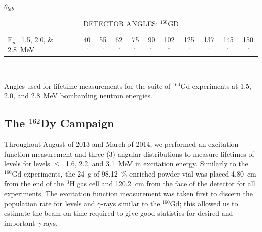 \begin{table}[h!]
\begin{center}
\caption{DETECTOR ANGLES: $^{160}$GD  \label{tab:GdAD}}
$\theta_{lab}$\\
\begin{tabular}{l|c|c|c|c|c|c|c|c|c|c}
\hline
\hline
E$_n$=1.5, 2.0, \& 2.8~MeV & 40$^{\circ}$ & 55$^{\circ}$ &  62$^{\circ}$ & 75$^{\circ}$ & 90$^{\circ}$ & 102$^{\circ}$ & 125$^{\circ}$ & 137$^{\circ}$ & 145$^{\circ}$ &  150$^{\circ}$\\
\end{tabular}\\
\vspace{10pt}
\end{center}
Angles used for lifetime measurements for the suite of $^{160}$Gd experiments at 1.5, 2.0, and 2.8~MeV bombarding neutron energies.
\end{table}


\subsection{The $^{162}$Dy Campaign}\label{sec:Dy_exp}
Throughout August of 2013 and March of 2014, we performed an excitation function measurement and three (3) angular distributions to measure lifetimes of levels for levels $\leq$~1.6, 2.2, and 3.1~MeV in excitation energy. Similarly to the $^{160}$Gd experiments, the 24~g of 98.12~\% enriched powder vial was placed 4.80~cm from the end of the $^3$H gas cell and 120.2~cm from the face of the detector for all experiments. The excitation function measurement was taken first to discern the population rate for levels and $\gamma$-rays similar to the $^{160}$Gd; this allowed us to estimate the beam-on time required to give good statistics for desired and important $\gamma$-rays. 

